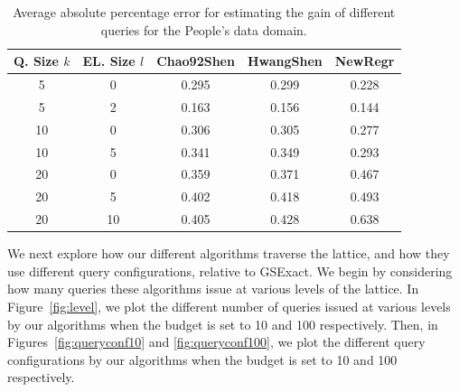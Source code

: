 \begin{table}[h]
\vspace{-10pt}
\scriptsize \center
\caption{Average absolute percentage error for estimating the gain of different queries for the People's data domain.}
\label{tab:peopleesterror}
\begin{tabular}{|c|c|c|c|c|}
\hline
\textbf{Q. Size $k$} & \textbf{EL. Size $l$} & \textbf{Chao92Shen} & \textbf{HwangShen} & \textbf{NewRegr} \\ \hline
5 & 0 & 0.295 & 0.299 & 0.228\\
5 & 2 & 0.163 &  0.156 & 0.144\\
10 & 0 &  0.306 & 0.305 & 0.277\\
10 & 5 &  0.341 & 0.349 & 0.293\\
20 & 0 &  0.359& 0.371 & 0.467 \\
20 & 5 &  0.402 & 0.418 & 0.493\\
20 & 10 & 0.405 & 0.428 & 0.638\\
\hline
\end{tabular}
\vspace{-5pt}
\end{table}


We next explore how our different algorithms traverse the lattice, and how they use different query configurations, relative to GSExact. We begin by considering how many queries these algorithms issue at various levels of the lattice. In Figure~\ref{fig:level}, we plot the different number of queries issued at various levels by our algorithms when the budget is set to 10 and 100 respectively.  Then, in Figures~\ref{fig:queryconf10} and \ref{fig:queryconf100}, we plot the different query configurations by our algorithms when the budget is set to 10 and 100 respectively. 


